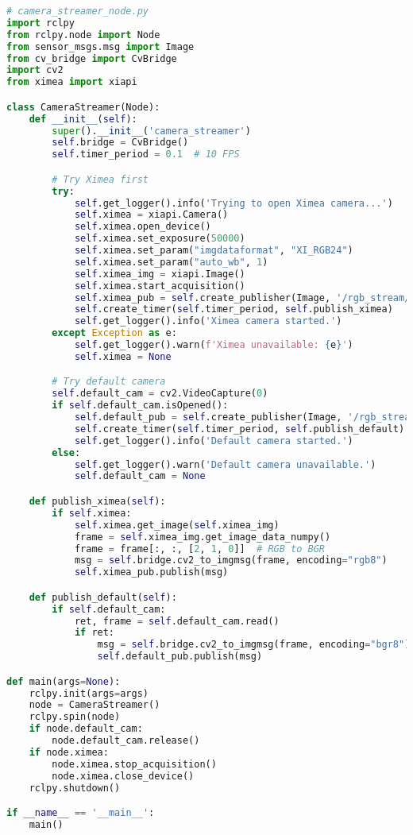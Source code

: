 \begin{lstlisting}[language=Python, caption={Python publisher snímok z kamier}, label={lst:image-publisher}]
# camera_streamer_node.py
import rclpy
from rclpy.node import Node
from sensor_msgs.msg import Image
from cv_bridge import CvBridge
import cv2
from ximea import xiapi

class CameraStreamer(Node):
    def __init__(self):
        super().__init__('camera_streamer')
        self.bridge = CvBridge()
        self.timer_period = 0.1  # 10 FPS

        # Try Ximea first
        try:
            self.get_logger().info('Trying to open Ximea camera...')
            self.ximea = xiapi.Camera()
            self.ximea.open_device()
            self.ximea.set_exposure(50000)
            self.ximea.set_param("imgdataformat", "XI_RGB24")
            self.ximea.set_param("auto_wb", 1)
            self.ximea_img = xiapi.Image()
            self.ximea.start_acquisition()
            self.ximea_pub = self.create_publisher(Image, '/rgb_stream/ximea', 10)
            self.create_timer(self.timer_period, self.publish_ximea)
            self.get_logger().info('Ximea camera started.')
        except Exception as e:
            self.get_logger().warn(f'Ximea unavailable: {e}')
            self.ximea = None

        # Try default camera
        self.default_cam = cv2.VideoCapture(0)
        if self.default_cam.isOpened():
            self.default_pub = self.create_publisher(Image, '/rgb_stream/default', 10)
            self.create_timer(self.timer_period, self.publish_default)
            self.get_logger().info('Default camera started.')
        else:
            self.get_logger().warn('Default camera unavailable.')
            self.default_cam = None

    def publish_ximea(self):
        if self.ximea:
            self.ximea.get_image(self.ximea_img)
            frame = self.ximea_img.get_image_data_numpy()
            frame = frame[:, :, [2, 1, 0]]  # RGB to BGR
            msg = self.bridge.cv2_to_imgmsg(frame, encoding="rgb8")
            self.ximea_pub.publish(msg)

    def publish_default(self):
        if self.default_cam:
            ret, frame = self.default_cam.read()
            if ret:
                msg = self.bridge.cv2_to_imgmsg(frame, encoding="bgr8")
                self.default_pub.publish(msg)

def main(args=None):
    rclpy.init(args=args)
    node = CameraStreamer()
    rclpy.spin(node)
    if node.default_cam:
        node.default_cam.release()
    if node.ximea:
        node.ximea.stop_acquisition()
        node.ximea.close_device()
    rclpy.shutdown()

if __name__ == '__main__':
    main()
  
\end{lstlisting}